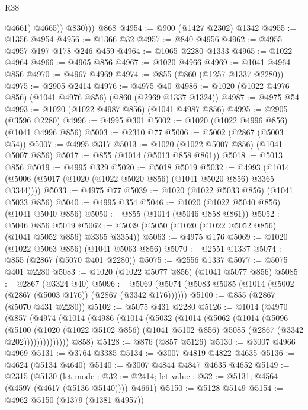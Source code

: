 \begin{lexlean}{R38}
\begin{coremodule}
              @4661)
            @4665))
          @830)))
    @868
@4954 := @900 (@1427 @2302) @1342
@4955 := @1356 @4954
@4956 := @1366 @32
@4957 := @840 @4956
@4962 := @4955 @4957 @197 @178 @246 @459
@4964 := @1065 @2280 @1333
@4965 := @1022 @4964
@4966 := @4965 @856
@4967 := @1020 @4966
@4969 := @1041 @4964 @856
@4970 := @4967 @4969
@4974 := @855 (@860 (@1257 @1337 @2280))
@4975 := @2905 @2414
@4976 := @4975 @40
@4986 := @1020 (@1022 @4976 @856) (@1041 @4976 @856) (@860 (@2969 @1337 @1324))
@4987 := @4975 @54
@4993 := @1020 (@1022 @4987 @856) (@1041 @4987 @856)
@4995 := @2905 (@3596 @2280)
@4996 := @4995 @301
@5002 := @1020 (@1022 @4996 @856) (@1041 @4996 @856)
@5003 := @2310 @77
@5006 := @5002 (@2867 (@5003 @54))
@5007 := @4995 @317
@5013 := @1020 (@1022 @5007 @856) (@1041 @5007 @856)
@5017 := @855 (@1014 (@5013 @858 @861))
@5018 := @5013 @856
@5019 := @4995 @329
@5020 := @5018 @5019
@5032 := @4993 (@1014 (@5006 (@5017 (@1020 (@1022 @5020 @856) (@1041 @5020 @856) @3365 @3344))))
@5033 := @4975 @77
@5039 := @1020 (@1022 @5033 @856) (@1041 @5033 @856)
@5040 := @4995 @354
@5046 := @1020 (@1022 @5040 @856) (@1041 @5040 @856)
@5050 := @855 (@1014 (@5046 @858 @861))
@5052 := @5046 @856 @5019
@5062 := @5039 (@5050 (@1020 (@1022 @5052 @856) (@1041 @5052 @856) @3365 @3354))
@5063 := @4975 @176
@5069 := @1020 (@1022 @5063 @856) (@1041 @5063 @856)
@5070 := @2551 @1337
@5074 := @855 (@2867 (@5070 @401 @2280))
@5075 := @2556 @1337
@5077 := @5075 @401 @2280
@5083 := @1020 (@1022 @5077 @856) (@1041 @5077 @856)
@5085 := @2867 (@3324 @40)
@5096 := @5069 (@5074 (@5083 @5085 (@1014 (@5002 (@2867 (@5003 @176)) (@2867 (@3342 @176))))))
@5100 := @855 (@2867 (@5070 @431 @2280))
@5102 := @5075 @431 @2280
@5126 := @1014
    (@4970
      (@857
        (@4974
          (@1014
            (@4986
              (@1014
                (@5032
                  (@1014
                    (@5062
                      (@1014
                        (@5096
                          (@5100
                            (@1020
                              (@1022 @5102 @856)
                              (@1041 @5102 @856)
                              @5085
                              (@2867 (@3342 @202))))))))))))))
      @858)
@5128 := @876 (@857 @5126)
@5130 := @3007 @4966 @4969
@5131 := @3764 @3385
@5134 := @3007 @4819 @4822 @4635
@5136 := @4624 (@5134 @4640)
@5140 := @3007 @4844 @4847 @4635 @4652
@5149 := @2315
    (@5130
      (let mode : @32 := @2414; let value : @32 := @5131; @4564 (@4597 (@4617 (@5136 @5140))))
      @4661)
@5150 := @5128 @5149
@5154 := @4962 @5150 (@1379 (@1381 @4957))

\end{coremodule}
\end{lexlean}
